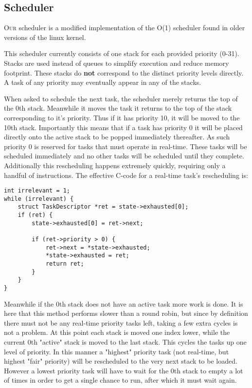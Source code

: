 \documentclass{amsart}
\begin{document}
\subsection*{Scheduler}

\textsc{Our} scheduler is a modified implementation of the O(1) scheduler found in older
versions of the linux kernel.

This scheduler currently consists of one stack for each provided priority
(0-31). Stacks are used instead of queues to simplify execution and reduce
memory footprint. These stacks do \textbf{not} correspond to the distinct
priority levels directly. A task of any priority may eventually appear in any of
the stacks.

When asked to schedule the next task, the scheduler merely returns the top of
the 0th stack. Meanwhile it moves the task it returns to the top of the stack
corresponding to it's priority. Thus if it has priority 10, it will be moved to
the 10th stack. Importantly this means that if a task has priority 0 it will be
placed directly onto the active stack to be popped immediately thereafter. As
such priority 0 is reserved for tasks that must operate in real-time. These
tasks will be scheduled immediately and no other tasks will be scheduled until
they complete. Additionally this rescheduling happens extremely quickly,
requiring only a handful of instructions. The effective C-code for a real-time
task's rescheduling is:

\begin{verbatim}
int irrelevant = 1;
while (irrelevant) {
	struct TaskDescriptor *ret = state->exhausted[0];
	if (ret) {
		state->exhausted[0] = ret->next;

		if (ret->priority > 0) {
			ret->next = *state->exhausted;
			*state->exhausted = ret;
			return ret;
		}
	}
}
\end{verbatim}

Meanwhile if the 0th stack does not have an active task more work is
done. It is here that this method performs slower than a round robin, but since
by definition there must not be any real-time priority tasks left, taking a few
extra cycles is not a problem. At this point each stack is moved one index
lower, while the current 0th "active" stack is moved to the last stack. This
cycles the tasks up one level of priority. In this manner a "highest" priority
task (not real-time, but highest "fair" priority) will be rescheduled to the
very next stack to be loaded. However a lowest priority task will have to wait
for the 0th stack to empty a lot of times in order to get a single chance to
run, after which it must wait again.
\end{document}
